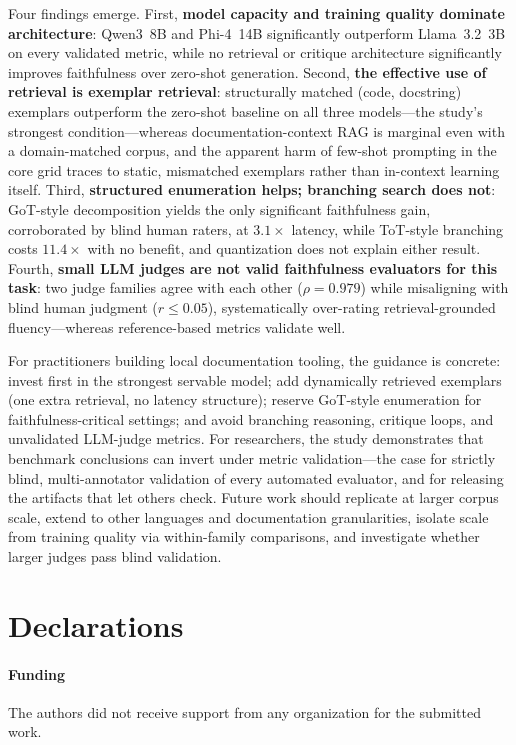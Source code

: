 \documentclass[pdflatex,sn-mathphys-ay]{sn-jnl}%
\theoremstyle{thmstyleone}%
\theoremstyle{thmstyletwo}%
\theoremstyle{thmstylethree}%
\begin{document}
{Four findings emerge. First, \textbf{model capacity and training quality dominate architecture}: Qwen3~8B and Phi-4~14B significantly outperform Llama~3.2~3B on every validated metric, while no retrieval or critique architecture significantly improves faithfulness over zero-shot generation. Second, \textbf{the effective use of retrieval is exemplar retrieval}: structurally matched (code, docstring) exemplars outperform the zero-shot baseline on all three models---the study's strongest condition---whereas documentation-context RAG is marginal even with a domain-matched corpus, and the apparent harm of few-shot prompting in the core grid traces to static, mismatched exemplars rather than in-context learning itself. Third, \textbf{structured enumeration helps; branching search does not}: GoT-style decomposition yields the only significant faithfulness gain, corroborated by blind human raters, at $3.1\times$ latency, while ToT-style branching costs $11.4\times$ with no benefit, and quantization does not explain either result. Fourth, \textbf{small LLM judges are not valid faithfulness evaluators for this task}: two judge families agree with each other ($\rho=0.979$) while misaligning with blind human judgment ($r\le0.05$), systematically over-rating retrieval-grounded fluency---whereas reference-based metrics validate well.

For practitioners building local documentation tooling, the guidance is concrete: invest first in the strongest servable model; add dynamically retrieved exemplars (one extra retrieval, no latency structure); reserve GoT-style enumeration for faithfulness-critical settings; and avoid branching reasoning, critique loops, and unvalidated LLM-judge metrics. For researchers, the study demonstrates that benchmark conclusions can invert under metric validation---the case for strictly blind, multi-annotator validation of every automated evaluator, and for releasing the artifacts that let others check. Future work should replicate at larger corpus scale, extend to other languages and documentation granularities, isolate scale from training quality via within-family comparisons, and investigate whether larger judges pass blind validation.


}
\section*{Declarations}

\paragraph{Funding}
The authors did not receive support from any organization for the submitted work.
\end{document}
